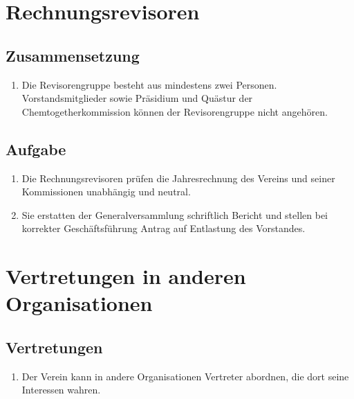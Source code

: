 \section{Rechnungsrevisoren}

\subsection{Zusammensetzung}
\begin{enumerate}
\item Die Revisorengruppe besteht aus mindestens zwei Personen. Vorstandsmitglieder sowie Präsidium und Quästur der Chemtogetherkommission können der Revisorengruppe nicht angehören.
\end{enumerate}

\subsection{Aufgabe}
\begin{enumerate}
\item Die Rechnungsrevisoren prüfen die Jahresrechnung des Vereins und seiner Kommissionen unabhängig und neutral.
\item Sie erstatten der Generalversammlung schriftlich Bericht und stellen bei korrekter Geschäftsführung Antrag auf Entlastung des Vorstandes.
\end{enumerate}


\section{Vertretungen in anderen Organisationen}
\label{sec:Vertretungen}
\subsection{Vertretungen}
\begin{enumerate}
\item Der Verein kann in andere Organisationen Vertreter abordnen, die dort seine Interessen wahren.
\end{enumerate}

